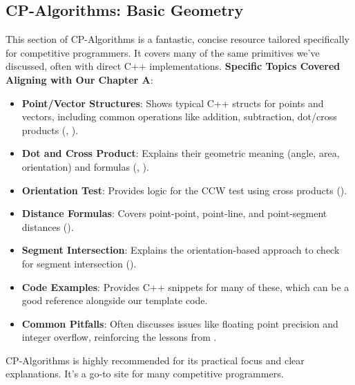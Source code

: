 \subsection{CP-Algorithms: Basic Geometry}
\label{ssec:A.6.2}

\begin{furtherreading}
\label{fr:A.6.2.cpalgo}
This section of CP-Algorithms is a fantastic, concise resource tailored specifically for competitive programmers. It covers many of the same primitives we've discussed, often with direct C++ implementations.
\textbf{Specific Topics Covered Aligning with Our Chapter A}:
\begin{itemize}
    \item \textbf{Point/Vector Structures}: Shows typical C++ structs for points and vectors, including common operations like addition, subtraction, dot/cross products (, ).
    \item \textbf{Dot and Cross Product}: Explains their geometric meaning (angle, area, orientation) and formulas (, ).
    \item \textbf{Orientation Test}: Provides logic for the CCW test using cross products ().
    \item \textbf{Distance Formulas}: Covers point-point, point-line, and point-segment distances ().
    \item \textbf{Segment Intersection}: Explains the orientation-based approach to check for segment intersection ().
    \item \textbf{Code Examples}: Provides C++ snippets for many of these, which can be a good reference alongside our template code.
    \item \textbf{Common Pitfalls}: Often discusses issues like floating point precision and integer overflow, reinforcing the lessons from .
\end{itemize}
CP-Algorithms is highly recommended for its practical focus and clear explanations. It's a go-to site for many competitive programmers.
\end{furtherreading}